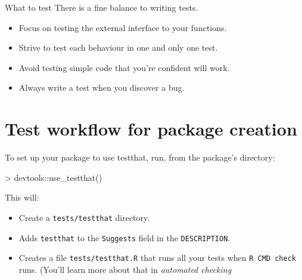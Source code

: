 \documentclass[12pt,handout]{beamer}
\begin{document}
\begin{frame}[fragile]{What to test}
There is a fine balance to writing tests. 

\begin{itemize}
\item Focus on testing the external interface to your functions.

\item Strive to test each behaviour in one and only one test.

\item Avoid testing simple code that you're confident will work.

\item Always write a test when you discover a bug.

\end{itemize}

\end{frame}

\section{Test workflow for package creation}
\begin{frame}[fragile]
To set up your package to use testthat, run, from the package's directory:

\begin{Schunk}
\begin{Sinput}
> devtools::use_testthat()
\end{Sinput}
\end{Schunk}


This will:
\begin{itemize}

\item  Create a \texttt{tests/testthat} directory.

\item  Adds \texttt{testthat} to the \texttt{Suggests} field in the \texttt{DESCRIPTION}.

\item  Creates a file \texttt{tests/testthat.R} that runs all your tests when
    \texttt{R CMD check} runs. (You'll learn more about that in \textit{automated checking}
\end{itemize}

\end{frame}
\end{document}
